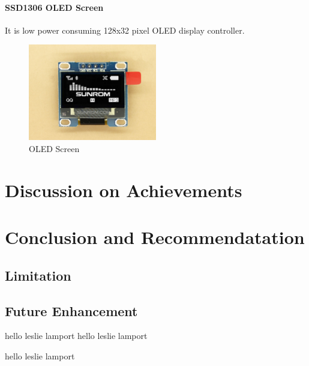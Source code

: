 \documentclass[a4paper,12pt]{article}
\begin{document}
    \paragraph{SSD1306 OLED Screen}
    It is low power consuming 128x32 pixel OLED display controller. 

    \begin{figure}[H]
        \centering
        \includegraphics[width=0.5\textwidth ]{./images/ssd1306.jpg}
        \caption{OLED Screen}
    \end{figure}
    \newpage
    \section{Discussion on Achievements}

    \newpage
    \section{Conclusion and Recommendatation}
    \subsection{Limitation}

    \subsection{Future Enhancement}

    hello leslie lamport 
     hello leslie lamport 

    hello leslie lamport 


\end{document}
